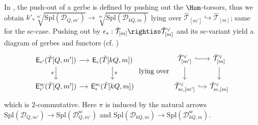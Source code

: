 \documentclass[a4paper,10pt]{article}
\begin{document}
In \cite[\S 19.3.2]{Weis17}, the push-out of a gerbe is defined by pushing out the $\Hom$-torsors, thus we obtain $k'_* \sqrt[m']{ \text{Spl}(\mathcal{D}_{Q,m'}) } \to \sqrt[m]{\text{Spl}(\mathcal{D}_{kQ, m})}$ lying over $\hat{\mathcal{T}}_{[m']} \hookrightarrow \hat{\mathcal{T}}_{[m]}$; same for the sc-case. Pushing out by $\epsilon_*: \hat{\mathcal{T}}_{[m]} \rightiso \tilde{\mathcal{T}}^\vee_{[m]}$ and its sc-variant yield a diagram of gerbes and functors (cf. \cite[\S 3.1]{Weis17})
\begin{equation}\label{eqn:E-functors} \begin{tikzcd}[column sep=small]
	\mathsf{E}_{\epsilon'}(\tilde{T}[Q, m']) \arrow{r} \arrow{d}[swap]{\pi} & \mathsf{E}_\epsilon(\tilde{T}[kQ, m]) \arrow{d}{\pi} \\
	\mathsf{E}_{\epsilon'}^\text{sc}(\tilde{T}[Q, m']) \arrow{r} & \mathsf{E}^\text{sc}_\epsilon(\tilde{T}[kQ, m])
\end{tikzcd} \;\text{lying over}\; \begin{tikzcd}[column sep=small]
	\tilde{\mathcal{T}}^\vee_{[m']} \arrow{d} \arrow[hookrightarrow]{r} & \tilde{\mathcal{T}}^\vee_{[m]} \arrow{d} \\
	\tilde{\mathcal{T}}^\vee_{\text{sc}, [m']} \arrow[hookrightarrow]{r} & \tilde{\mathcal{T}}^\vee_{\text{sc}, [m]}
\end{tikzcd}\end{equation}
which is $2$-commutative. Here $\pi$ is induced by the natural arrows $\text{Spl}(\mathcal{D}_{Q,m'}) \to \text{Spl}(\mathcal{D}^\text{sc}_{Q, m'})$ and $\text{Spl}(\mathcal{D}_{kQ,m}) \to \text{Spl}(\mathcal{D}^\text{sc}_{kQ, m})$.
\end{document}
